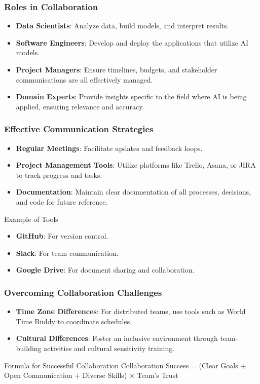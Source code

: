 \documentclass[aspectratio=169]{beamer}
\begin{document}
\begin{frame}[fragile]
    \frametitle{Roles in Collaboration}
    \begin{itemize}
        \item \textbf{Data Scientists}: Analyze data, build models, and interpret results.
        \item \textbf{Software Engineers}: Develop and deploy the applications that utilize AI models.
        \item \textbf{Project Managers}: Ensure timelines, budgets, and stakeholder communications are all effectively managed.
        \item \textbf{Domain Experts}: Provide insights specific to the field where AI is being applied, ensuring relevance and accuracy.
    \end{itemize}
\end{frame}

\begin{frame}[fragile]
    \frametitle{Effective Communication Strategies}
    \begin{itemize}
        \item \textbf{Regular Meetings}: Facilitate updates and feedback loops.
        \item \textbf{Project Management Tools}: Utilize platforms like Trello, Asana, or JIRA to track progress and tasks.
        \item \textbf{Documentation}: Maintain clear documentation of all processes, decisions, and code for future reference.
    \end{itemize}
    
    \begin{block}{Example of Tools}
        \begin{itemize}
            \item \textbf{GitHub}: For version control.
            \item \textbf{Slack}: For team communication.
            \item \textbf{Google Drive}: For document sharing and collaboration.
        \end{itemize}
    \end{block}
\end{frame}

\begin{frame}[fragile]
    \frametitle{Overcoming Collaboration Challenges}
    \begin{itemize}
        \item \textbf{Time Zone Differences}: For distributed teams, use tools such as World Time Buddy to coordinate schedules.
        \item \textbf{Cultural Differences}: Foster an inclusive environment through team-building activities and cultural sensitivity training.
    \end{itemize}
    
    \begin{block}{Formula for Successful Collaboration}
        Collaboration Success = (Clear Goals + Open Communication + Diverse Skills) $\times$ Team's Trust
    \end{block}
\end{frame}
\end{document}
